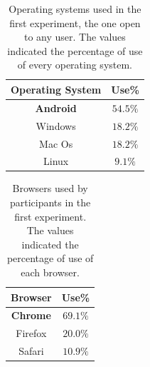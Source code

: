 \documentclass{article}
\begin{document}



\newpage
\clearpage

\setlength{\tabcolsep}{10pt}
\begin{table}
\caption{Operating systems used in the first experiment, the one open to any user. The values indicated the percentage of use of every operating system.}
\label{tab:ooss-first-experiment}
\begin{center}
\begin{tabular}{cc}
{\bf Operating System} & {\bf Use\%} \\
\hline
\bf Android & $\mathbf{54.5\%}$ \\
Windows & $18.2\%$ \\
Mac Os & $18.2\%$ \\
Linux & $9.1\%$ \\
\hline
\end{tabular}
\end{center}
\end{table}


\newpage
\clearpage

\setlength{\tabcolsep}{10pt}
\begin{table}
\caption{Browsers used by participants in the first experiment. The values indicated the percentage of use of each browser.}
\label{tab:browsers-first-experiment}
\begin{center}
\begin{tabular}{cc}
{\bf Browser} & {\bf Use\%} \\
\hline
\bf Chrome & $\mathbf{69.1\%}$ \\
Firefox & $20.0\%$ \\
Safari & $10.9\%$ \\
\hline
\end{tabular}
\end{center}
\end{table}

\newpage
\clearpage
\end{document}
